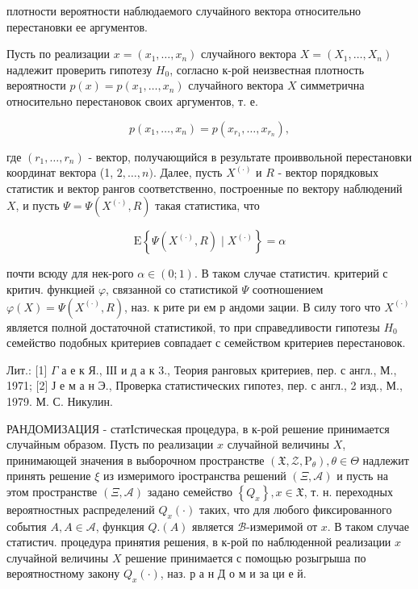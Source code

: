 \documentclass[10pt]{article}
\begin{document}
плотности вероятности наблюдаемого случайного вектора относительно перестановки ее аргументов.



Пусть по реализации $x=\left(x_{1}, \ldots, x_{n}\right)$ случайного вектора $X=\left(X_{1}, \ldots, X_{n}\right)$ надлежит проверить гипотезу $H_{0}$, согласно к-рой неизвестная плотность вероятности $p(x)=p\left(x_{1}, \ldots, x_{n}\right)$ случайного вектора $X$ симметрична относительно перестановок своих аргументов, т. е.



\[

p\left(x_{1}, \ldots, x_{n}\right)=p\left(x_{r_{1}}, \ldots, x_{r_{n}}\right),

\]



где $\left(r_{1}, \ldots, r_{n}\right)$ - вектор, получающийся в результате проиввольной перестановки координат вектора (1, $2, \ldots, n)$. Далее, пусть $X^{(\cdot)}$ и $R$ - вектор порядковых статистик и вектор рангов соответственно, построенные по вектору наблюдений $X$, и пусть $\Psi=\Psi\left(X^{(\cdot)}, R\right)$ такая статистика, что



\[

\mathrm{E}\left\{\Psi\left(X^{(\cdot)}, R\right) \mid X^{(\cdot)}\right\}=\alpha

\]



почти всюду для нек-рого $\alpha \in(0 ; 1)$. В таком случае статистич. критерий с критич. функцией $\varphi$, связанной со статистикой $\Psi$ соотношением $\varphi(X)=\Psi\left(X^{(\cdot)}, R\right)$, наз. к рите ри ем р андоми зации. В силу того что $X^{(\cdot)}$ является полной достаточной статистикой, то при справедливости гипотезы $H_{0}$ семейство подобных критериев совпадает с семейством критериев перестановок.



Лит.: [1] $\Gamma$ а е к Я., ІІІ и д а к 3., Теория ранговых критериев, пер. с англ., М., 1971; [2] Ј е м а н Э., Проверка статистических гипотез, пер. с англ., 2 изд., М., 1979. М. С. Никулин.



РАНДОМИЗАЦИЯ - статІстическая процедура, в к-рой решение принимается случайным образом. Пусть по реализации $x$ случайной величины $X$, принимающей значения в выборочном пространстве $\left(\mathfrak{X}, \mathscr{Z}, \mathrm{P}_{\theta}\right), \theta \in \Theta$ надлежит принять решение $\xi$ из измеримого іространства решений $(\Xi, \mathcal{A})$ и пусть на этом пространстве $(\Xi, \mathcal{A})$ задано семейство $\left\{Q_{x}\right\}, x \in \mathfrak{X}$, т. н. переходных вероятностных распределений $Q_{x}(\cdot)$ таких, что для любого фиксированного события $A, A \in \mathcal{A}$, функция $Q .(A)$ является $\mathscr{B}$-измеримой от $x$. В таком случае статистич. процедура принятия решения, в к-рой по наблюденной реализации $x$ случайной величины $X$ решение принимается с помощью розыгрыша по вероятностному закону $Q_{x}(\cdot)$, наз. р а н Д о м и за ци е й.
\end{document}
